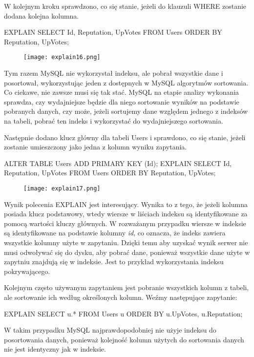 W kolejnym kroku sprawdzono, co się stanie, jeżeli do klauzuli WHERE zostanie dodana kolejna kolumna.
\begin{spverbatim}
	EXPLAIN SELECT Id, Reputation, UpVotes FROM Users ORDER BY Reputation, UpVotes;
\end{spverbatim}
\begin{figure}[h!]
	\texttt{[image: explain16.png]} 
\end{figure}
Tym razem MySQL nie wykorzystał indeksu, ale pobrał wszystkie dane i posortował, wykorzystując jeden z dostępnych w MySQL algorytmów sortowania. Co ciekawe, nie zawsze musi się tak stać. MySQL na etapie analizy wykonania sprawdza, czy wydajniejsze będzie dla niego sortowanie wyników na podstawie pobranych danych, czy może, jeżeli sortujemy dane względem jednego z indeksów na tabeli, pobrać ten indeks i wykorzystać do wydajniejszego sortowania.

Następnie dodano klucz główny dla tabeli Users i sprawdono, co się stanie, jeżeli zostanie umieszczony jako jedna z kolumn wyniku zapytania.
\begin{spverbatim}
	ALTER TABLE Users ADD PRIMARY KEY (Id);
	EXPLAIN SELECT Id, Reputation, UpVotes FROM Users ORDER BY Reputation, UpVotes;
\end{spverbatim}

\begin{figure}[h!]
	\texttt{[image: explain17.png]} 
\end{figure}
Wynik polecenia EXPLAIN jest interesujący. Wynika to z tego, że jeżeli kolumna posiada klucz podstawowy, wtedy wiersze w liściach indeksu są identyfikowane za pomocą wartości kluczy głównych. W rozważanym przypadku wiersze w indeksie są identyfikowane na podstawie kolumny \textit{id}, co oznacza, że indeks zawiera wszystkie kolumny użyte w zapytaniu.
Dzięki temu aby uzyskać wynik serwer nie musi odwoływać się do dysku, aby pobrać dane, ponieważ wszystkie dane użyte w zapytniu znajdują się w indeksie. Jest to przykład wykorzystania indeksu pokrywającego.

Kolejnym często używanym zapytaniem jest pobranie wszystkich kolumn z tabeli, ale sortowanie ich według określonych kolumn. Weźmy następujące zapytanie:
\begin{spverbatim}
	EXPLAIN SELECT u.* FROM Users u ORDER BY u.UpVotes, u.Reputation;
\end{spverbatim}
W takim przypadku MySQL najprawdopodobniej nie użyje indeksu do posortowania danych, ponieważ kolejność kolumn użytych do sortowania danych nie jest identyczny jak w indeksie.

